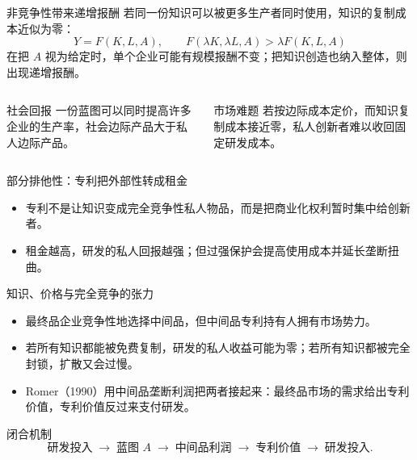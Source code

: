 \documentclass[aspectratio=32]{beamer}
\begin{document}
\begin{frame}{非竞争性带来递增报酬}
\small
若同一份知识可以被更多生产者同时使用，知识的复制成本近似为零：
\[
  Y=F(K,L,A),\qquad F(\lambda K,\lambda L,A)>\lambda F(K,L,A)
\]
在把 $A$ 视为给定时，单个企业可能有规模报酬不变；把知识创造也纳入整体，则出现递增报酬。
\begin{columns}[T]
\begin{block}{社会回报}
一份蓝图可以同时提高许多企业的生产率，社会边际产品大于私人边际产品。
\end{block}
\begin{block}{市场难题}
若按边际成本定价，而知识复制成本接近零，私人创新者难以收回固定研发成本。
\end{block}
\end{columns}
\end{frame}

\begin{frame}{部分排他性：专利把外部性转成租金}
\small
\begin{center}
\end{center}
\vspace{0.15cm}
\begin{itemize}
  \item 专利不是让知识变成完全竞争性私人物品，而是把商业化权利暂时集中给创新者。
  \item 租金越高，研发的私人回报越强；但过强保护会提高使用成本并延长垄断扭曲。
\end{itemize}
\end{frame}

\begin{frame}{知识、价格与完全竞争的张力}
\small
\begin{itemize}
  \item 最终品企业竞争性地选择中间品，但中间品专利持有人拥有市场势力。
  \item 若所有知识都能被免费复制，研发的私人收益可能为零；若所有知识都被完全封锁，扩散又会过慢。
  \item Romer（1990）用中间品垄断利润把两者接起来：最终品市场的需求给出专利价值，专利价值反过来支付研发。
\end{itemize}
\begin{alertblock}{闭合机制}
\[
  \text{研发投入}\;\longrightarrow\;\text{蓝图 }A\;\longrightarrow\;\text{中间品利润}\;\longrightarrow\;\text{专利价值}\;\longrightarrow\;\text{研发投入}.
\]
\end{alertblock}
\end{frame}
\end{document}
